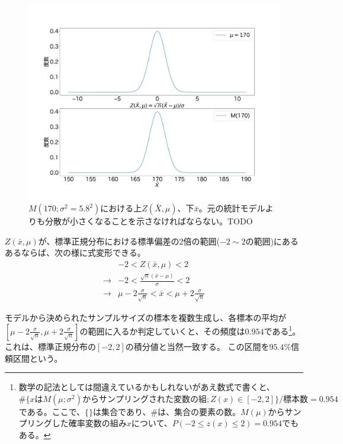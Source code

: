 \begin{figure}
    \begin{center}
        \includegraphics[width=15cm]{./image/03_/normal_Z_frequency.pdf}
        \caption{$M(170;\sigma^2=5.8^2)$における上$Z(\bar{X},\mu)$、下$\bar{x}$。元の統計モデルよりも分散が小さくなることを示さなければならない。TODO}
        \label{fig:cm_standard_normal_distribution}
    \end{center}
\end{figure}
\fi


$Z(\bar{x},\mu)$が、標準正規分布における標準偏差の2倍の範囲($-2 \sim 2$の範囲)にあるあるならば、次の様に式変形できる。
\begin{eqnarray*}
    & -2 < Z(\bar{x},\mu)<2 \\
\rightarrow & -2 < \frac{\sqrt{n}(\bar{x}-\mu)}{\sigma}  <2 \\
\rightarrow & \mu - 2 \frac{\sigma}{\sqrt{n}} < \bar{x} < \mu + 2\frac{\sigma}{\sqrt{n}}
\end{eqnarray*}

モデルから決められたサンプルサイズの標本を複数生成し、各標本の平均が$[\mu - 2 \frac{\sigma}{\sqrt{n}} ,\mu + 2\frac{\sigma}{\sqrt{n}}]$の範囲に入るか判定していくと、その頻度は$0.954$である\footnote{数学の記法としては間違えているかもしれないがあえ数式で書くと、$\#\{xはM(\mu;\sigma^2)からサンプリングされた変数の組; Z(x)\in[-2,2]\}/標本数=0.954$である。ここで、$\{\}$は集合であり、$\#{}$は、集合の要素の数。$M(\mu)$からサンプリングした確率変数の組み$x$について、$P(-2\leq z(x)\leq 2)=0.954$でもある。}。これは、標準正規分布の$[-2,2]$の積分値と当然一致する。
この区間を$95.4\%$信頼区間という。

